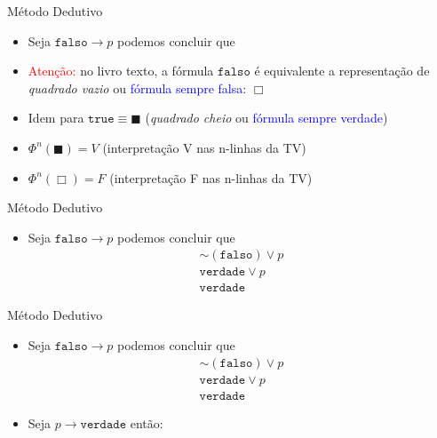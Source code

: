 \begin{frame}[t]{Método Dedutivo}
	\begin{itemize}
	\item Seja $\mathtt{falso} \rightarrow p$ podemos concluir que
	\item \textcolor{red}{Atenção:} no livro texto, a fórmula $\mathtt{falso}$ é equivalente
	a representação de \textit{quadrado vazio} ou \textcolor{blue}{fórmula sempre falsa}: $\Box $
	
	\item Idem para $\mathtt{true} \equiv \blacksquare $ (\textit{quadrado cheio} ou \textcolor{blue}{fórmula sempre verdade})
	
	\item $\Phi ^n(\blacksquare) = V$ \hspace{1cm}  (interpretação V nas n-linhas da TV)
	
	\item $\Phi ^n(\Box) = F$ \hspace{1cm}  (interpretação F nas n-linhas da TV)
	\end{itemize}
\end{frame}

\begin{frame}[t]{Método Dedutivo}
	\begin{itemize}
	\item Seja $\mathtt{falso} \rightarrow p$ podemos concluir que $$\begin{array}{c}\sim(\mathtt{falso}) \vee p \\ \mathtt{verdade} \vee p \\ \mathtt{verdade}\end{array}$$
	\end{itemize}
\end{frame}

\begin{frame}[t]{Método Dedutivo}
	\begin{itemize}
	\item Seja $\mathtt{falso} \rightarrow p$ podemos concluir que $$\begin{array}{c}\sim(\mathtt{falso}) \vee p \\ \mathtt{verdade} \vee p \\ \mathtt{verdade}\end{array}$$

	\item Seja $p \rightarrow \mathtt{verdade}$ então:
	\end{itemize}
\end{frame}

